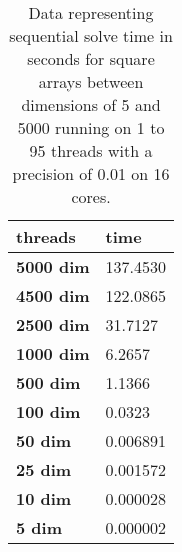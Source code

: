 \begin{table}[ht]
\centering
\begin{tabular}{|l|l|}
\hline
\textbf{threads}  & \textbf{time} \\ \hline
\textbf{5000 dim} & 137.4530            \\ \hline
\textbf{4500 dim} & 122.0865            \\ \hline
\textbf{2500 dim} & 31.7127             \\ \hline
\textbf{1000 dim} & 6.2657              \\ \hline
\textbf{500 dim}  & 1.1366              \\ \hline
\textbf{100 dim}  & 0.0323              \\ \hline
\textbf{50 dim}   & 0.006891            \\ \hline
\textbf{25 dim}   & 0.001572            \\ \hline
\textbf{10 dim}   & 0.000028            \\ \hline
\textbf{5 dim}    & 0.000002            \\ \hline
\end{tabular}
\caption{Data representing sequential solve time in seconds for square arrays between dimensions of 5 and 5000 running on 1 to 95 threads with a precision of 0.01 on 16 cores.}
\end{table}